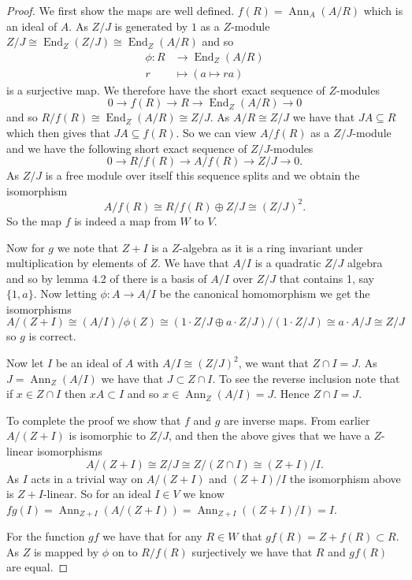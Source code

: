 \documentclass[12pt,a4paper,abstracton,bibtotoc]{scrreprt}
\theoremstyle{definition}
\DeclareMathOperator{\Ann}{Ann}
\DeclareMathOperator{\End}{End}
\begin{document}
\begin{proof}\cite[Thm. 4.1, pp. 35]{brakenhoff}
We first show the maps are well defined.
$f(R) = \Ann_{A}(A/R)$ which is an ideal of $A$.
As $Z/J$ is generated by $1$ as a $Z$-module $Z/J\cong \End_Z (Z/J) \cong \End_Z(A/R)$ and so
\begin{align*}
\phi \colon R &\to \End_Z(A/R) \\
r&\mapsto (a\mapsto ra)
\end{align*}
is a surjective map.
We therefore have the short exact sequence of $Z$-modules
\[
0\to f(R) \to R \to \End_Z(A/R) \to 0
\]
and so $R/f(R) \cong \End_Z(A/R) \cong Z/J$.
As $A/R\cong Z/J$ we have that $JA\subseteq R$ which then gives that $JA \subseteq f(R)$.
So we can view $A/f(R)$ as a $Z/J$-module and we have the following short exact sequence of $Z/J$-modules
\[
0\to R/f(R) \to A/f(R) \to Z/J \to 0.
\]
As $Z/J$ is a free module over itself this sequence splits and we obtain the isomorphism
\[
A/f(R) \cong R/f(R) \oplus Z/J \cong (Z/J)^2.
\]
So the map $f$ is indeed a map from $W$ to $V$.

Now for $g$ we note that $Z + I$ is a $Z$-algebra as it is a ring invariant under multiplication by elements of $Z$.
We have that $A/I$ is a quadratic $Z/J$ algebra and so by lemma 4.2 of \cite{brakenhoff} there is a basis of $A/I$ over $Z/J$ that contains 1, say $\{1,a\}$.
Now letting $\phi\colon A \to A/I$ be the canonical homomorphism we get the isomorphisms
\[
A/(Z + I) \cong (A/I)/\phi(Z) \cong (1\cdot Z/J\oplus a\cdot Z/J)/(1\cdot Z/J) \cong a\cdot A/J \cong Z/J
\]
so $g$ is correct.

Now let $I$ be an ideal of $A$ with $A/I \cong (Z/J)^2$, we want that $Z\cap I = J$.
As $J = \Ann_Z(A/I)$ we have that $J\subset Z\cap I$.
To see the reverse inclusion note that if $x\in Z\cap I$ then $xA\subset I$ and so $x\in \Ann_Z(A/I) = J$.
Hence $Z\cap I = J$.

To complete the proof we show that $f$ and $g$ are inverse maps.
From earlier $A/(Z+ I)$ is isomorphic to $Z/J$, and then the above gives that we have a $Z$-linear isomorphisms
\[
A/(Z+I) \cong Z/J \cong Z/(Z\cap I) \cong (Z+I)/I.
\]
As $I$ acts in a trivial way on $A/(Z+I)$ and $(Z+I)/I$ the isomorphism above is $Z+ I$-linear.
So for an ideal $I\in V$ we know $fg(I) = \Ann_{Z + I}(A/(Z+I)) = \Ann_{Z+I}((Z+I)/I) = I$.

For the function $gf$ we have that for any $R\in W$ that $gf(R) = Z + f(R) \subset R$.
As $Z$ is mapped by $\phi$ on to $R/f(R)$ surjectively we have that $R$ and $gf(R)$ are equal.
\end{proof}
\end{document}
